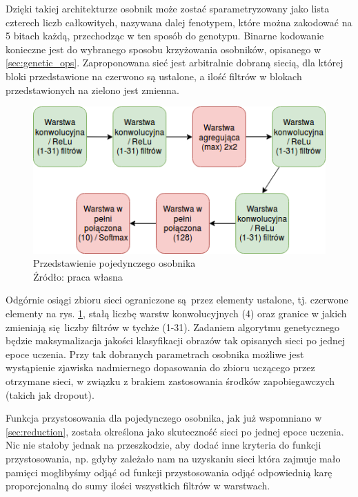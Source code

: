 Dzięki takiej architekturze osobnik może zostać sparametryzowany jako lista czterech liczb całkowitych, nazywana dalej fenotypem, które można zakodować na 5 bitach każdą, przechodząc w ten sposób do genotypu.
Binarne kodowanie konieczne jest do wybranego sposobu krzyżowania osobników, opisanego w \ref{sec:genetic_ops}.
Zaproponowana sieć jest arbitralnie dobraną siecią, dla której bloki przedstawione na czerwono są ustalone, a ilość filtrów w blokach przedstawionych na zielono jest zmienna.

\begin{figure}[h!tb]
	 \centering
	 \includegraphics[width = 1.0\linewidth]{img/fenotyp}
	 \caption{Przedstawienie pojedynczego osobnika \\
              Źródło: praca własna}
	 \label{fig:fenotyp}
\end{figure}

Odgórnie osiągi zbioru sieci ograniczone są przez elementy ustalone, tj. czerwone elementy na rys. \ref{fig:fenotyp}, stałą liczbę warstw konwolucyjnych (4) oraz granice w jakich zmieniają się liczby filtrów w tychże (1-31).
Zadaniem algorytmu genetycznego będzie maksymalizacja jakości klasyfikacji obrazów tak opisanych sieci po jednej epoce uczenia.
Przy tak dobranych parametrach osobnika możliwe jest wystąpienie zjawiska nadmiernego dopasowania do zbioru uczącego przez otrzymane sieci, w związku z brakiem zastosowania środków zapobiegawczych (takich jak dropout).

Funkcja przystosowania dla pojedynczego osobnika, jak już wspomniano w \ref{sec:reduction}, została określona jako skuteczność sieci po jednej epoce uczenia.
Nic nie stałoby jednak na przeszkodzie, aby dodać inne kryteria do funkcji przystosowania, np. gdyby zależało nam na uzyskaniu sieci która zajmuje mało pamięci moglibyśmy odjąć od funkcji przystosowania odjąć odpowiednią karę proporcjonalną do sumy ilości wszystkich filtrów w warstwach.

